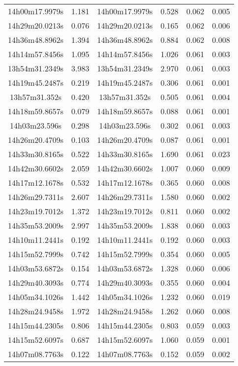 \begin{table}
\begin{tabular}{cccccc}
14h00m17.9979s & 1.181 & 14h00m17.9979s & 0.528 & 0.062 & 0.005 \\
14h29m20.0213s & 0.076 & 14h29m20.0213s & 0.165 & 0.062 & 0.006 \\
14h36m48.8962s & 1.394 & 14h36m48.8962s & 0.884 & 0.062 & 0.008 \\
14h14m57.8456s & 1.095 & 14h14m57.8456s & 1.026 & 0.061 & 0.003 \\
13h54m31.2349s & 3.983 & 13h54m31.2349s & 2.970 & 0.061 & 0.003 \\
14h19m45.2487s & 0.219 & 14h19m45.2487s & 0.306 & 0.061 & 0.001 \\
13h57m31.352s & 0.420 & 13h57m31.352s & 0.505 & 0.061 & 0.004 \\
14h18m59.8657s & 0.079 & 14h18m59.8657s & 0.088 & 0.061 & 0.001 \\
14h03m23.596s & 0.298 & 14h03m23.596s & 0.302 & 0.061 & 0.003 \\
14h26m20.4709s & 0.103 & 14h26m20.4709s & 0.087 & 0.061 & 0.001 \\
14h33m30.8165s & 0.522 & 14h33m30.8165s & 1.690 & 0.061 & 0.023 \\
14h42m30.6602s & 2.059 & 14h42m30.6602s & 1.007 & 0.060 & 0.009 \\
14h17m12.1678s & 0.532 & 14h17m12.1678s & 0.365 & 0.060 & 0.008 \\
14h26m29.7311s & 2.607 & 14h26m29.7311s & 1.580 & 0.060 & 0.002 \\
14h23m19.7012s & 1.372 & 14h23m19.7012s & 0.811 & 0.060 & 0.002 \\
14h35m53.2009s & 2.997 & 14h35m53.2009s & 1.838 & 0.060 & 0.003 \\
14h10m11.2441s & 0.192 & 14h10m11.2441s & 0.192 & 0.060 & 0.003 \\
14h15m52.7999s & 0.742 & 14h15m52.7999s & 0.354 & 0.060 & 0.005 \\
14h03m53.6872s & 0.154 & 14h03m53.6872s & 1.328 & 0.060 & 0.006 \\
14h29m40.3093s & 0.774 & 14h29m40.3093s & 0.355 & 0.060 & 0.004 \\
14h05m34.1026s & 1.442 & 14h05m34.1026s & 1.232 & 0.060 & 0.019 \\
14h28m24.9458s & 1.972 & 14h28m24.9458s & 1.262 & 0.060 & 0.008 \\
14h15m44.2305s & 0.806 & 14h15m44.2305s & 0.803 & 0.059 & 0.003 \\
14h15m52.6097s & 0.687 & 14h15m52.6097s & 1.060 & 0.059 & 0.001 \\
14h07m08.7763s & 0.122 & 14h07m08.7763s & 0.152 & 0.059 & 0.002 \\

\end{tabular}
\end{table}
